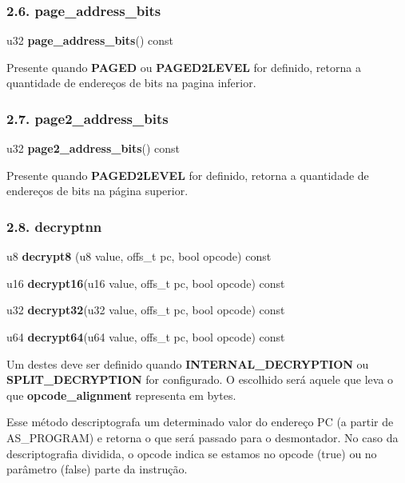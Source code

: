 \documentclass[letterpaper,10pt,brazil]{sphinxmanual}
\begin{document}
\subsubsection{2.6. page\_address\_bits}
\label{techspecs/device_disasm_interface:page-address-bits}
\begin{DUlineblock}{0em}
\item[] u32 \textbf{page\_address\_bits}() const
\end{DUlineblock}

Presente quando \textbf{PAGED} ou \textbf{PAGED2LEVEL} for definido, retorna a
quantidade de endereços de bits na pagina inferior.


\subsubsection{2.7. page2\_address\_bits}
\label{techspecs/device_disasm_interface:page2-address-bits}
\begin{DUlineblock}{0em}
\item[] u32 \textbf{page2\_address\_bits}() const
\end{DUlineblock}

Presente quando \textbf{PAGED2LEVEL} for definido, retorna a quantidade
de endereços de bits na página superior.


\subsubsection{2.8. decryptnn}
\label{techspecs/device_disasm_interface:decryptnn}
\begin{DUlineblock}{0em}
\item[] u8  \textbf{decrypt8} (u8  value, offs\_t pc, bool opcode) const
\item[] u16 \textbf{decrypt16}(u16 value, offs\_t pc, bool opcode) const
\item[] u32 \textbf{decrypt32}(u32 value, offs\_t pc, bool opcode) const
\item[] u64 \textbf{decrypt64}(u64 value, offs\_t pc, bool opcode) const
\end{DUlineblock}

Um destes deve ser definido quando \textbf{INTERNAL\_DECRYPTION} ou
\textbf{SPLIT\_DECRYPTION} for configurado. O escolhido será aquele que leva
o que \textbf{opcode\_alignment} representa em bytes.

Esse método descriptografa um determinado valor do endereço PC (a partir
de AS\_PROGRAM) e retorna o que será passado para o desmontador.
No caso da descriptografia dividida, o opcode indica se estamos no
opcode (true) ou no parâmetro (false) parte da instrução.
\end{document}
